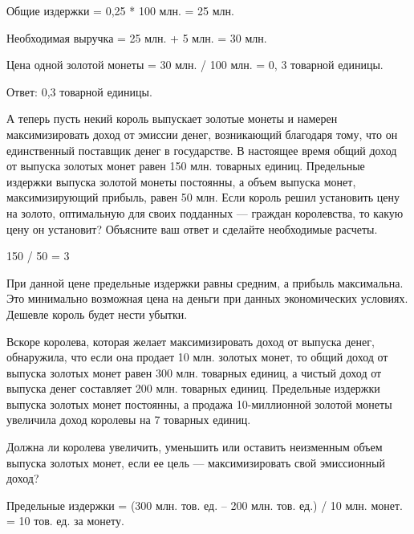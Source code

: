 \documentclass[12pt, table, a4paper,twoside]{exam}
\begin{document}
\begin{questions}
\begin{solution}[12em]

Общие издержки = 0,25 * 100 млн. = 25 млн.

Необходимая выручка = 25 млн. + 5 млн. = 30 млн.

Цена одной золотой монеты = 30 млн. / 100 млн. = 0, 3 товарной единицы.

Ответ: 0,3 товарной единицы.

\end{solution}

\question[10] А теперь пусть некий король выпускает золотые монеты и намерен максимизировать доход от эмиссии денег, возникающий благодаря тому, что он единственный поставщик денег в государстве. В настоящее время общий доход от выпуска золотых монет равен 150 млн. товарных единиц. Предельные издержки выпуска золотой монеты постоянны, а объем выпуска монет, максимизирующий прибыль, равен 50 млн. Если король решил установить цену на золото, оптимальную для своих подданных — граждан королевства, то какую цену он установит? Объясните ваш ответ и сделайте необходимые расчеты.

\begin{solution}[12em]
	
	150 / 50 = 3
	
	При данной цене предельные издержки равны средним, а прибыль максимальна. Это минимально возможная цена на деньги при данных экономических условиях. Дешевле король будет нести убытки.
	
\end{solution}

\question[10] Вскоре королева, которая желает максимизировать доход от выпуска денег, обнаружила, что если она продает 10 млн. золотых монет, то общий доход от выпуска золотых монет равен 300 млн. товарных единиц, а чистый доход от выпуска денег составляет 200 млн. товарных единиц. Предельные издержки выпуска золотых монет постоянны, а продажа 10-миллионной золотой монеты увеличила доход королевы на 7 товарных единиц.

\noaddpoints

\begin{subparts}
	\subpart[5] Должна ли королева увеличить, уменьшить или оставить неизменным объем выпуска золотых монет, если ее цель — максимизировать свой эмиссионный доход?
		
	\begin{solution}[12em]
	
	Предельные издержки = (300 млн. тов. ед. – 200 млн. тов. ед.) / 10 млн. монет. = 10 тов. ед. за монету.
	

\end{solution}
\end{subparts}
\end{questions}
\end{document}
